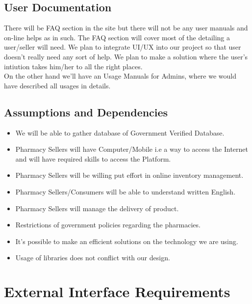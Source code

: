 \documentclass{scrreprt}
\begin{document}
\section{User Documentation}
There will be FAQ section in the site but there will not be any user manuals and on-line helps as in such. The FAQ section will cover most of the detailing a user/seller will need. We plan to integrate UI/UX into our project so that user doesn’t really need any sort of help. We plan to make a solution where the user’s intiution takes him/her to all the right places.   \\

On the other hand we’ll have an Usage Manuals for Admins, where we would have described all usages in details.   \\


\section{Assumptions and Dependencies}
\begin{itemize}
\item We will be able to gather database of Government Verified Database.
\item Pharmacy Sellers will have Computer/Mobile i.e a way to access the Internet
and will have required skills to access the Platform.
\item Pharmacy Sellers will be willing put effort in online inventory management.
\item Pharmacy Sellers/Consumers will be able to understand written English.
\item Pharmacy Sellers will manage the delivery of product.
\item Restrictions of government policies regarding the pharmacies.
\item It’s possible to make an efficient solutions on the technology we are using.
\item Usage of libraries does not conflict with our design.
\end{itemize}

\chapter{External Interface Requirements}
\end{document}
